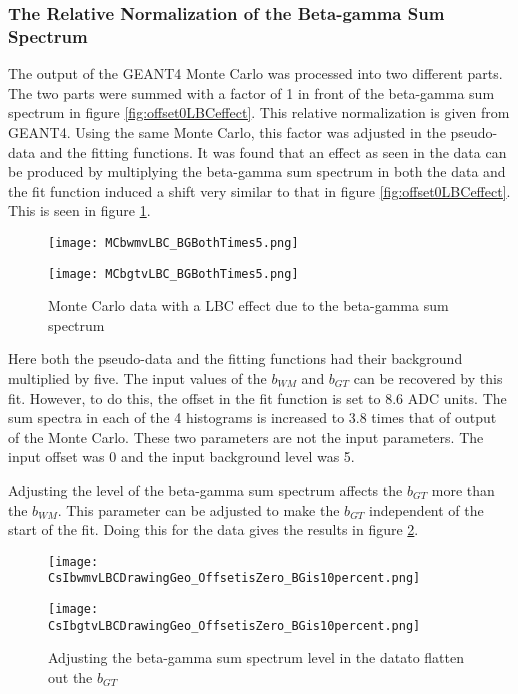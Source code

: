 \documentclass[../MaxHughesThesis.tex]{subfiles}
\begin{document}
\subsubsection{The Relative Normalization of the Beta-gamma Sum Spectrum}

The output of the GEANT4 Monte Carlo was processed into two different parts.
The two parts were summed with a factor of 1 in front of the beta-gamma sum spectrum in figure \ref{fig:offset0LBCeffect}.
This relative normalization is given from GEANT4.
Using the same Monte Carlo, this factor was adjusted in the pseudo-data and the fitting functions.
It was found that an effect as seen in the data can be produced by multiplying the beta-gamma sum spectrum in both the data and the fit function induced a shift very similar to that in figure \ref{fig:offset0LBCeffect}.
This is seen in figure \ref{fig:MCTimes5}.    

\begin{figure}
    \centering
    \begin{minipage}{0.50\textwidth}
        \centerline{\texttt{[image: MCbwmvLBC\_BGBothTimes5.png]}}
    \end{minipage}\hfill
    \begin{minipage}{0.50\textwidth}
        \centerline{\texttt{[image: MCbgtvLBC\_BGBothTimes5.png]}}
    \end{minipage}
    \caption{Monte Carlo data with a LBC effect due to the beta-gamma sum spectrum}
    \label{fig:MCTimes5}
\end{figure}

Here both the pseudo-data and the fitting functions had their background multiplied by five. 
The input values of the $b_{WM}$ and $b_{GT}$ can be recovered by this fit.
However, to do this, the offset in the fit function is set to 8.6 ADC units.
The sum spectra in each of the 4 histograms is increased to 3.8 times that of output of the Monte Carlo.
These two parameters are not the input parameters.
The input offset was 0 and the input background level was 5.

Adjusting the level of the beta-gamma sum spectrum affects the $b_{GT}$ more than the $b_{WM}$.
This parameter can be adjusted to make the $b_{GT}$ independent of the start of the fit.
Doing this for the data gives the results in figure \ref{fig:dataoffset0BG10per}. 

\begin{figure}
    \centering
    \begin{minipage}{0.50\textwidth}
        \centerline{\texttt{[image: CsIbwmvLBCDrawingGeo\_OffsetisZero\_BGis10percent.png]}}
    \end{minipage}\hfill
    \begin{minipage}{0.50\textwidth}
        \centerline{\texttt{[image: CsIbgtvLBCDrawingGeo\_OffsetisZero\_BGis10percent.png]}}
    \end{minipage}
    \caption{Adjusting the beta-gamma sum spectrum level in the datato flatten out the $b_{GT}$}
    \label{fig:dataoffset0BG10per}
\end{figure}
\end{document}
